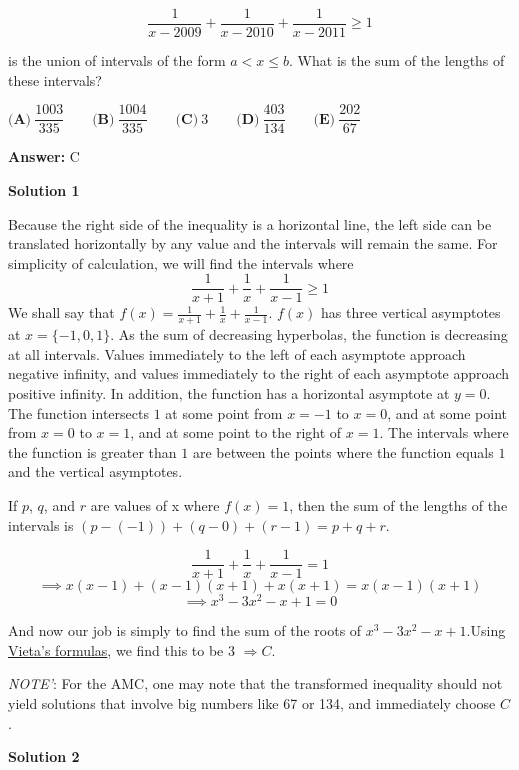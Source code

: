 \begin{enumerate}
 
 \[\dfrac{1}{x-2009}+\dfrac{1}{x-2010}+\dfrac{1}{x-2011}\ge1\]


 is the union of intervals of the form $a<x\le b$. What is the sum of the lengths of these intervals?


 $\textbf{(A)}\ \dfrac{1003}{335} \qquad \textbf{(B)}\ \dfrac{1004}{335} \qquad \textbf{(C)}\ 3 \qquad \textbf{(D)}\ \dfrac{403}{134} \qquad \textbf{(E)}\ \dfrac{202}{67}$

 \textbf{Answer: }C



\textbf{Solution 1}

Because the right side of the inequality is a horizontal line, the left side can be translated horizontally by any value and the intervals will remain the same. For simplicity of calculation, we will find the intervals where 
 \[\frac{1}{x+1}+\frac{1}{x}+\frac{1}{x-1}\ge1\]We shall say that $f(x)=\frac{1}{x+1}+\frac{1}{x}+\frac{1}{x-1}$. $f(x)$ has three vertical asymptotes at $x=\{-1,0,1\}$. As the sum of decreasing hyperbolas, the function is decreasing at all intervals. Values immediately to the left of each asymptote approach negative infinity, and values immediately to the right of each asymptote approach positive infinity. In addition, the function has a horizontal asymptote at $y=0$. The function intersects $1$ at some point from $x=-1$ to $x=0$, and at some point from $x=0$ to $x=1$, and at some point to the right of $x=1$. The intervals where the function is greater than $1$ are between the points where the function equals $1$ and the vertical asymptotes.

 If $p$, $q$, and $r$ are values of x where $f(x)=1$, then the sum of the lengths of the intervals is $(p-(-1))+(q-0)+(r-1)=p+q+r$.

 
 \[\frac{1}{x+1}+\frac{1}{x}+\frac{1}{x-1}=1\]
 \[\implies x(x-1)+(x-1)(x+1)+x(x+1)=x(x-1)(x+1)\]
 \[\implies x^3-3x^2-x+1=0\]

 And now our job is simply to find the sum of the roots of $x^3-3x^2-x+1$.Using \href{https://artofproblemsolving.com/wiki/index.php?title=Vieta\%27s\_formulas}{Vieta's formulas}, we find this to be $3$ $\Rightarrow\boxed{C}$.

 \textit{NOTE'}: For the AMC, one may note that the transformed inequality should not yield solutions that involve big numbers like 67 or 134, and immediately choose $C$.

 



\textbf{Solution 2}


\end{enumerate}
